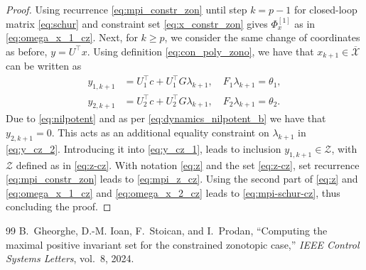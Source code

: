 \documentclass[10pt,a4paper]{amsart}
\begin{document}
\begin{proof}
Using recurrence \eqref{eq:mpi_constr_zon} until step $k=p-1$ for closed-loop matrix \eqref{eq:schur} and constraint set \eqref{eq:x_constr_zon} gives $\Phi_x^{[1]}$ as in \eqref{eq:omega_x_1_cz}. Next, for $k\geq p$, we consider the same change of coordinates as before, $y=U^\top x$. Using definition \eqref{eq:con_poly_zono}, we have that $x_{k+1}\in \overline{\mathcal X}$ can be written as
\begin{subequations}
\label{eq:y_cz}
\begin{align}
\label{eq:y_cz_1}
    y_{1, k+1}&=U_1^\top c + U_1^\top G\lambda_{k+1},\quad F_1\lambda_{k+1} = \theta_1,\\
\label{eq:y_cz_2}
y_{2, k+1}&=U_2^\top c + U_2^\top G\lambda_{k+1},\quad F_2\lambda_{k+1} = \theta_2.
\end{align}    
\end{subequations}
Due to \eqref{eq:nilpotent} and as per \eqref{eq:dynamics_nilpotent_b} we have that $y_{2, k+1}=0$. This acts as an additional equality constraint on $\lambda_{k+1}$ in \eqref{eq:y_cz_2}. Introducing it into \eqref{eq:y_cz_1}, leads to inclusion $y_{1,k+1}\in \mathcal Z$, with $\mathcal Z$ defined as in \eqref{eq:z-cz}. With notation \eqref{eq:z} and the set \eqref{eq:z-cz}, set recurrence \eqref{eq:mpi_constr_zon} leads to \eqref{eq:mpi_z_cz}. Using the second part of \eqref{eq:z} and \eqref{eq:omega_x_1_cz} and \eqref{eq:omega_x_2_cz} leads to \eqref{eq:mpi-schur-cz}, thus concluding the proof.
\end{proof}

\begin{thebibliography}{99}
 B.~Gheorghe, D.-M. Ioan, F.~Stoican, and I.~Prodan, ``Computing the maximal positive invariant set for the constrained zonotopic case,'' \emph{IEEE Control Systems Letters}, vol.~8, 2024.
\end{thebibliography}
\end{document}
